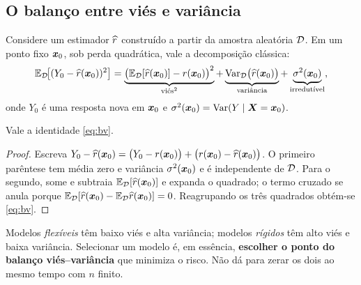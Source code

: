 \documentclass[11pt,a4paper]{article}
\begin{document}
\subsection{O balanço entre viés e variância}
Considere um estimador $\widehat{r}$ construído a partir da amostra aleatória $\mathcal{D}$.
Em um ponto fixo $\bm{x}_0$, sob perda quadrática, vale a decomposição clássica:
\begin{equation}\label{eq:bv}
  \mathbb{E}_{\mathcal{D}}\!\big[(Y_0-\widehat{r}(\bm{x}_0))^2\big]
  = \underbrace{\big(\mathbb{E}_{\mathcal{D}}[\widehat{r}(\bm{x}_0)]-r(\bm{x}_0)\big)^2}_{\text{viés}^2}
  + \underbrace{\operatorname{Var}_{\mathcal{D}}\!\big(\widehat{r}(\bm{x}_0)\big)}_{\text{variância}}
  + \underbrace{\sigma^2(\bm{x}_0)}_{\text{irredutível}},
\end{equation}
onde $Y_0$ é uma resposta nova em $\bm{x}_0$ e $\sigma^2(\bm{x}_0)=\operatorname{Var}(Y\mid\bm{X}=\bm{x}_0)$.

\begin{teorema}\label{teo:bv}
Vale a identidade \eqref{eq:bv}.
\end{teorema}
\begin{proof}
Escreva $Y_0-\widehat{r}(\bm{x}_0) = \big(Y_0-r(\bm{x}_0)\big) + \big(r(\bm{x}_0)-\widehat{r}(\bm{x}_0)\big)$.
O primeiro parêntese tem média zero e variância $\sigma^2(\bm{x}_0)$ e é independente
de $\mathcal{D}$. Para o segundo, some e subtraia $\mathbb{E}_{\mathcal{D}}[\widehat{r}(\bm{x}_0)]$ e
expanda o quadrado; o termo cruzado se anula porque
$\mathbb{E}_{\mathcal{D}}[\widehat{r}(\bm{x}_0)-\mathbb{E}_{\mathcal{D}}\widehat{r}(\bm{x}_0)]=0$. Reagrupando os três quadrados
obtém-se \eqref{eq:bv}.
\end{proof}

\begin{ideia}
Modelos \emph{flexíveis} têm baixo viés e alta variância; modelos \emph{rígidos}
têm alto viés e baixa variância. Selecionar um modelo é, em essência,
\textbf{escolher o ponto do balanço viés--variância} que minimiza o risco. Não dá
para zerar os dois ao mesmo tempo com $n$ finito.
\end{ideia}

\end{document}
